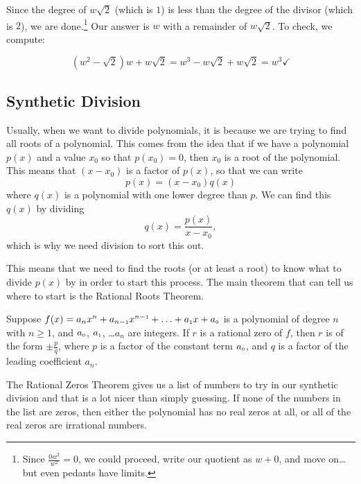 \documentclass{ximera}
\begin{document}
\begin{exampleSol}
\begin{enumerate}
            Since the degree of $w\sqrt{2}$ (which is $1$) is less than the degree of the divisor (which is $2$), we are done.\footnote{Since $\frac{0w^2}{w^2} = 0$, we could proceed, write our quotient as $w+0$, and move on\ldots but even pedants have limits.}  Our answer is $w$ with a remainder of $w \sqrt{2}$.  To check, we compute:
            
            \[ 
                \left(w^2 - \sqrt{2}\right)w + w\sqrt{2} = w^3 - w\sqrt{2} + w\sqrt{2} = w^3  \checkmark
            \]
    \end{enumerate}
\end{exampleSol}


\subsection{Synthetic Division}

Usually, when we want to divide polynomials, it is because we are trying to find all roots of a polynomial. This comes from the idea that if we have a polynomial $p(x)$ and a value $x_0$ so that $p(x_0) = 0$, then $x_0$ is a root of the polynomial. This means that $(x-x_0)$ is a factor of $p(x)$, so that we can write 
\[ 
    p(x) = (x-x_0)q(x) 
\] 
where $q(x)$ is a polynomial with one lower degree than $p$. We can find this $q(x)$ by dividing
\[ 
    q(x) = \frac{p(x)}{x-x_0}, 
\] 
which is why we need division to sort this out. 

This means that we need to find the roots (or at least a root) to know what to divide $p(x)$ by in order to start this process. The main theorem that can tell us where to start is the Rational Roots Theorem. 

\begin{theorem}
    \label{RZT}
     Suppose $f(x) = a_{n} x^{n} + a_{n-\mbox{\tiny$1$}}x^{n-\mbox{\tiny$1$}} + \ldots + a_{\mbox{\tiny$1$}} x + a_{\mbox{\tiny$0$}}$ is a polynomial of degree $n$ with $n \geq 1$, and $a_{\mbox{\tiny$0$}}$, $a_{\mbox{\tiny$1$}}$, \ldots $a_{n}$ are integers.  If $r$ is a rational zero of $f$, then $r$ is of the form $\pm \frac{p}{q}$, where $p$ is a factor of the constant term $a_{\mbox{\tiny$0$}}$, and $q$ is a factor of the leading coefficient $a_{n}$.  
\end{theorem}

The Rational Zeros Theorem gives us a list of numbers to try in our synthetic division and that is a lot nicer than simply guessing.  If none of the numbers in the list are zeros, then either the polynomial has no real zeros at all, or all of the real zeros are irrational numbers.
\end{document}
